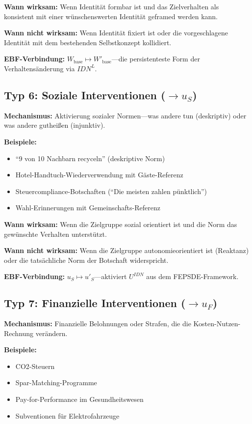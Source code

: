 \textbf{Wann wirksam:} Wenn Identität formbar ist und das Zielverhalten als konsistent mit einer wünschenswerten Identität geframed werden kann.

\textbf{Wann nicht wirksam:} Wenn Identität fixiert ist oder die vorgeschlagene Identität mit dem bestehenden Selbstkonzept kollidiert.

\textbf{EBF-Verbindung:} $W_{\text{base}} \mapsto W'_{\text{base}}$---die persistenteste Form der Verhaltensänderung via $IDN^L$.


\subsection{Typ 6: Soziale Interventionen ($\rightarrow u_S$)}
\label{sec:17-type-social}

\textbf{Mechanismus:} Aktivierung sozialer Normen---was andere tun (deskriptiv) oder was andere gutheißen (injunktiv).

\textbf{Beispiele:}
\begin{itemize}[nosep]
\item ``9 von 10 Nachbarn recyceln'' (deskriptive Norm)
\item Hotel-Handtuch-Wiederverwendung mit Gäste-Referenz
\item Steuercompliance-Botschaften (``Die meisten zahlen pünktlich'')
\item Wahl-Erinnerungen mit Gemeinschafts-Referenz
\end{itemize}

\textbf{Wann wirksam:} Wenn die Zielgruppe sozial orientiert ist und die Norm das gewünschte Verhalten unterstützt.

\textbf{Wann nicht wirksam:} Wenn die Zielgruppe autonomieorientiert ist (Reaktanz) oder die tatsächliche Norm der Botschaft widerspricht.

\textbf{EBF-Verbindung:} $u_S \mapsto u'_S$---aktiviert $U^{IDN}$ aus dem FEPSDE-Framework.


\subsection{Typ 7: Finanzielle Interventionen ($\rightarrow u_F$)}
\label{sec:17-type-financial}

\textbf{Mechanismus:} Finanzielle Belohnungen oder Strafen, die die Kosten-Nutzen-Rechnung verändern.

\textbf{Beispiele:}
\begin{itemize}[nosep]
\item CO2-Steuern
\item Spar-Matching-Programme
\item Pay-for-Performance im Gesundheitswesen
\item Subventionen für Elektrofahrzeuge
\end{itemize}

